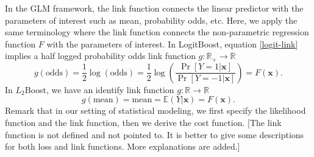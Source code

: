 \documentclass[11pt]{article}
\numberwithin{equation}{section}
\def\R{{\mathbb R}}  %
\def\E{{\mathbb E}}  %
\def\bx{\boldsymbol{x}}
\begin{document}
In the GLM framework, the link function connects the linear predictor with the parameters of interest such as mean, probability odds, etc.
Here, we apply the same terminology where the link function connects the  non-parametric regression function $F$ with the parameters of interest.
In LogitBoost, equation \eqref{logit-link} implies a half logged probability odds link function $g:\R_+\rightarrow\R$ 
$$g(\text{odds})=\frac{1}{2}\log(\text{odds})=\frac{1}{2}\log\left(\frac{\Pr[Y=1|\bx]}{\Pr[Y=-1|\bx]}\right)=F(\bx).$$
In $L_2$Boost, we have an identify link function $g:\R\rightarrow\R$
$$g(\text{mean})=\text{mean}=\E(Y|\bx)=F(\bx).$$
Remark that in our setting of statistical modeling, we first specify the likelihood function and the link function, then we derive the cost function.
{\color{blue}[The link function is not defined and not pointed to. It is better to give some descriptions for both loss and link functions. More explanations are added.]}


\end{document}
